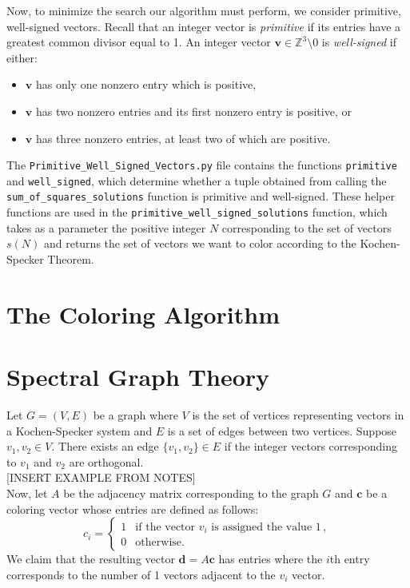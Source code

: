 \documentclass[11pt]{article}
\begin{document}
Now, to minimize the search our algorithm must perform, we consider primitive, well-signed vectors. Recall that an integer vector is \textit{primitive} if its entries have a greatest common divisor equal to 1. An integer vector $\mathbf{v} \in \mathbb{Z}^{3} \setminus 0$ is \textit{well-signed} if either:
\begin{itemize}
	\item $\mathbf{v}$ has only one nonzero entry which is positive,
	\item $\mathbf{v}$ has two nonzero entries and its first nonzero entry is positive, or
	\item $\mathbf{v}$ has three nonzero entries, at least two of which are positive. 
\end{itemize}
The \texttt{Primitive\_Well\_Signed\_Vectors.py} file contains the functions \texttt{primitive} and \texttt{well\_signed}, which determine whether a tuple obtained from calling the \texttt{sum\_of\_squares\_solutions} function is primitive and well-signed. These helper functions are used in the \texttt{primitive\_well\_signed\_solutions} function, which takes as a parameter the positive integer $N$ corresponding to the set of vectors $s(N)$ and returns the set of vectors we want to color according to the Kochen-Specker Theorem.

\section{The Coloring Algorithm}

\section{Spectral Graph Theory}
\hspace{\parindent}Let $G = (V, E)$ be a graph where $V$ is the set of vertices representing  vectors in a Kochen-Specker system and $E$ is a set of edges between two vertices. Suppose $v_{1}, v_{2} \in V$. There exists an edge $\{v_{1}, v_{2}\} \in E$ if the integer vectors corresponding to $v_{1}$ and $v_{2}$ are orthogonal.\\

[INSERT EXAMPLE FROM NOTES]\\

Now, let $A$ be the adjacency matrix corresponding to the graph $G$ and $\mathbf{c}$ be a coloring vector whose entries are defined as follows:
\[c_{i} = \begin{cases} 1 & \text{if the vector } v_{i} \text{ is assigned the value 1} \,, \\
						0 & \text{otherwise.}
\end{cases}\]
We claim that the resulting vector $\mathbf{d} = A \mathbf{c}$ has entries where the $i$th entry corresponds to the number of 1 vectors adjacent to the $v_{i}$ vector.
	

\end{document}
